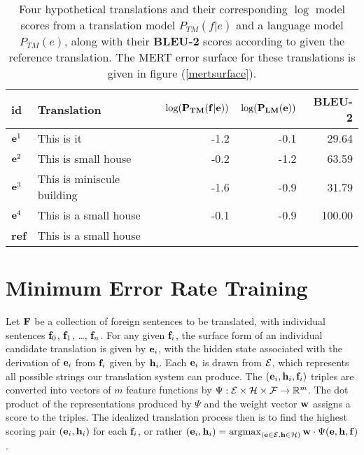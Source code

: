 \documentclass[11pt]{article}
\DeclareMathOperator*{\argmax}{argmax}
\begin{document}
\begin{table*}
\begin{center}
\begin{tabular}{|l|lrrr|}
\hline \bf id & \bf Translation  & $\bf \log(P_{TM}(f|e))$  & $\bf \log(P_{LM}(e))$ & {\bf BLEU-2} \\
\hline
${\bf e}^1$ & This is it  & -1.2 & -0.1 & 29.64 \\
${\bf e}^2$ & This is small house   & -0.2 & -1.2 & 63.59 \\
${\bf e}^3$ & This is miniscule building   & -1.6 & -0.9 & 31.79  \\
${\bf e}^4$ & This is a small house   & -0.1 & -0.9 & 100.00  \\
\hline
{\bf ref}  & This is a small house & & & \\
\hline
\end{tabular}
\end{center}
\caption{
\label{hscores}
Four hypothetical translations and their corresponding $\log$ model scores from a translation model $P_{TM}(f|e)$ and a language model $P_{TM}(e)$, along with their {\bf BLEU-2} scores according to given the reference translation. The MERT error surface for these translations is given in figure (\ref{mertsurface}).}
\end{table*}

\section{Minimum Error Rate Training}

Let ${\bf F}$ be a collection of foreign sentences to be translated, with individual sentences ${\bf f}_0$, ${\bf f}_1$, \ldots, ${\bf f}_n$. For any given ${\bf f}_i$, the surface form of an individual candidate translation is given by ${\bf e}_i$, with the hidden state associated with the derivation of ${\bf e}_i$ from ${\bf f}_i$ given by ${\bf h}_i$. Each ${\bf e}_i$ is drawn from ${\cal E}$, which represents all possible strings our translation system can produce. The $({\bf e}_i, {\bf h}_i, {\bf f}_i)$ triples are converted into vectors of $m$ feature functions by ${\Psi }:{\cal E}\times{\cal H}\times{\cal F} \rightarrow \mathbb{R}^m$. The dot product of the representations produced by ${\Psi}$ and the weight vector ${\bf w}$ assigns a score to the triples. The idealized translation process then is to find the highest scoring pair $({\bf e}_i, {\bf h}_i)$ for each ${\bf f}_i$, or rather $({\bf e}_i, {\bf h}_i) = \argmax_{({\bf e} \in {\cal E}, {\bf h} \in {\cal H})} {\bf w} \cdot \Psi({\bf e}, {\bf h}, {\bf f})$. 
\end{document}
